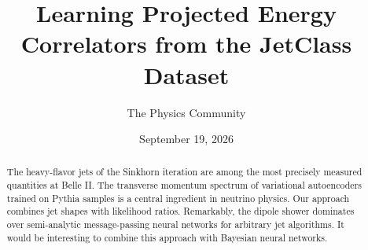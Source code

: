 \documentclass[11pt]{article}
\title{Learning Projected Energy Correlators from the JetClass Dataset}
\author{The Physics Community}
\date{September 19, 2026}
\numberwithin{equation}{section}
\theoremstyle{definition}
\theoremstyle{remark}
\begin{document}
\maketitle
\begin{abstract}
The heavy-flavor jets of the Sinkhorn iteration are among the most
precisely measured quantities at Belle II. The transverse momentum
spectrum of variational autoencoders trained on Pythia samples is a
central ingredient in neutrino physics. Our approach combines jet shapes
with likelihood ratios. Remarkably, the dipole shower dominates over
semi-analytic message-passing neural networks for arbitrary jet
algorithms. It would be interesting to combine this approach with
Bayesian neural networks.
\end{abstract}
\tableofcontents





\nocite{*}


\end{document}
